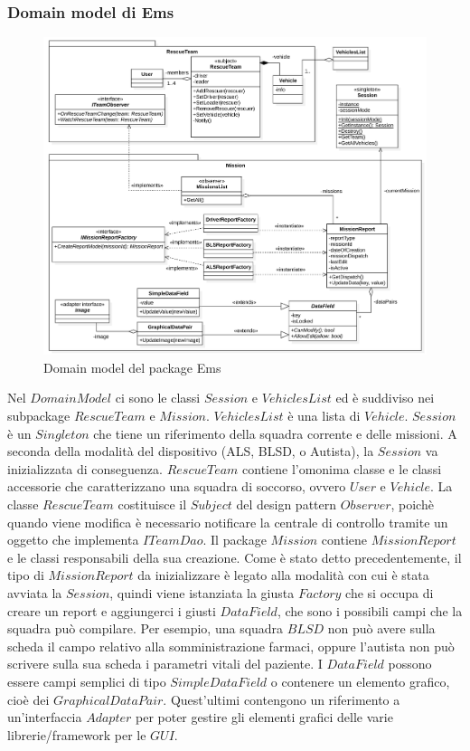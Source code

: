 \documentclass{article}
\begin{document}
    \subsubsection{Domain model di Ems}
    \begin{figure}
        \centering
        \includegraphics[width=5.4in]{diagrams/png/uml-ems-domain.png}
        \caption{Domain model del package Ems}
        \label{fig:uml-ems-domainmodel}
    \end{figure}
    Nel $DomainModel$ ci sono le classi $Session$ e $VehiclesList$ ed è suddiviso nei subpackage $RescueTeam$ e $Mission$.
    $VehiclesList$ è una lista di $Vehicle$. $Session$ è un $Singleton$ che tiene un riferimento della squadra corrente e delle missioni.
    A seconda della modalità del dispositivo (ALS, BLSD, o Autista), la $Session$ va inizializzata di conseguenza.
    $RescueTeam$ contiene l'omonima classe e le classi accessorie che caratterizzano una squadra di soccorso, ovvero $User$ e $Vehicle$.
    La classe $RescueTeam$ costituisce il $Subject$ del design pattern $Observer$, poichè quando viene modifica è necessario notificare la centrale di controllo tramite un oggetto che implementa $ITeamDao$.
    \newline Il package $Mission$ contiene $MissionReport$ e le classi responsabili della sua creazione.
    \newline Come è stato detto precedentemente, il tipo di $MissionReport$ da inizializzare è legato alla modalità con cui è stata avviata la $Session$,
    quindi viene istanziata la giusta $Factory$ che si occupa di creare un report e aggiungerci i giusti $DataField$, che sono i possibili campi che la squadra può compilare.
    Per esempio, una squadra $BLSD$ non può avere sulla scheda il campo relativo alla somministrazione farmaci, oppure l'autista non può scrivere sulla sua scheda i parametri vitali del paziente.
    I $DataField$ possono essere campi semplici di tipo $SimpleDataField$ o contenere un elemento grafico, cioè dei $GraphicalDataPair$.
    Quest'ultimi contengono un riferimento a un'interfaccia $Adapter$ per poter gestire gli elementi grafici delle varie librerie/framework per le $GUI$.
\end{document}
